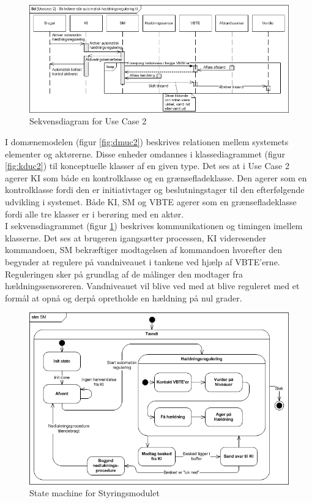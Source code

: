 \begin{figure}[htbp]
\centering
\includegraphics[scale=0.8]{billeder/Systemarkitektur/SD_UC2}
\caption{Sekvensdiagram for Use Case 2}
\label{fig:sduc2}
\end{figure}

I domænemodelen (figur \ref{fig:dmuc2}) beskrives relationen mellem systemets elementer og aktørerne. Disse enheder omdannes i klassediagrammet (figur \ref{fig:kduc2}) til konceptuelle klasser af en given type. Det ses at i Use Case 2 agerer KI som både en kontrolklasse og en grænsefladeklasse. Den agerer som en kontrolklasse fordi den er initiativtager og beslutningstager til den efterfølgende udvikling i systemet. Både KI, SM og VBTE agerer som en grænsefladeklasse fordi alle tre klasser er i berøring med en aktør.\\
I sekvensdiagrammet (figur \ref{fig:sduc2}) beskrives kommunikationen og timingen imellem klasserne. Det ses at brugeren igangsætter processen, KI videresender kommandoen, SM bekræftiger modtagelsen af kommandoen hvorefter den begynder at regulere på vandniveauet i tankene ved hjælp af VBTE'erne. Reguleringen sker på grundlag af de målinger den modtager fra hældningssensoreren. Vandniveauet vil blive ved med at blive reguleret med et formål at opnå og derpå opretholde en hældning på nul grader.

\begin{figure}[htbp]
\centering
\includegraphics[scale=0.8]{billeder/Systemarkitektur/stm_sm}
\caption{State machine for Styringsmodulet}
\label{fig:stm_sm}
\end{figure}

